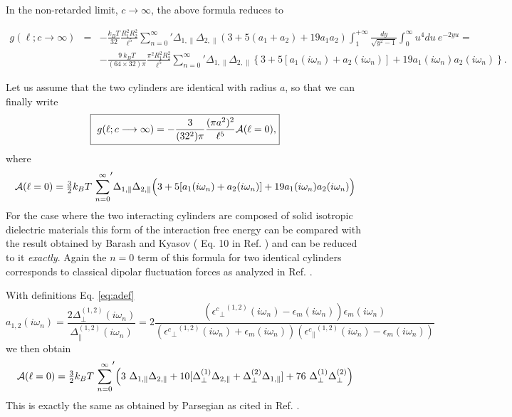\documentclass[onecolumn,letterpaper,amsmath,amssymb,floatfix,aps,superscriptaddress]{revtex4}
\begin{document}
In the non-retarded limit, $c \longrightarrow \infty$, the above formula  reduces to 
\begin{widetext}
\begin{eqnarray}
g(\ell; c \longrightarrow \infty) &=& - \frac{k_BT}{32} \frac{ R_1^{2} R_2^{2} }{\ell^5} {\sum_{n=0}^{\infty}}' \Delta_{1,\parallel} \Delta_{2,\parallel} 
\left( 3 + 5 (a_1+a_2) + 19 a_1 a_2 \right) \int_{1}^{+\infty}\!\!\!\!\! \frac{dy}{\sqrt{y^2 - 1}} \int_0^{\infty}\!\!\! u^4 du ~{e^{-2 y u }} = \nonumber\\
& & - \frac{9 ~k_BT}{(64 \times 32) \pi } \frac{\pi^2 R_1^{2} R_2^{2}}{\ell^5} {\sum_{n=0}^{\infty}}' \Delta_{1,\parallel} \Delta_{2,\parallel}
\left \{ 3 + 5 [ a_1(i \omega_n) + a_2(i \omega_n) ] + 19 a_1(i \omega_n) a_2(i \omega_n) \right \}.
\label{eq:cyl-paral-nonretarded}
\end{eqnarray}
\end{widetext}
Let us assume that the two cylinders are identical with radius $a$, so that we can finally write
\begin{equation}
  \fbox{
    $\displaystyle{
g(\ell; c \longrightarrow \infty) = - \frac{3}{(32^2) \pi } \frac{(\pi a^2)^{2}}{\ell^5} {\cal A}(\ell = 0),
\label{eq:cyl-paral-nonretarded-frq3}}$}
\end{equation}
where
\begin{equation}
{\cal A}(\ell = 0) = {\textstyle\frac32} {k_BT} ~ {\sum_{n=0}^{\infty}}' \Delta_{1,\parallel} \Delta_{2,\parallel}
\Big( 3 + 5 [ a_1(i \omega_n) + a_2(i \omega_n) ] + 19 a_1(i \omega_n) a_2(i \omega_n) \Big)
\end{equation}
For the case where the two interacting cylinders are composed of solid isotropic dielectric materials this form of the interaction free energy can be compared with the result obtained by Barash and Kyasov ( Eq. 10 in Ref. ) and can be reduced to it {\sl exactly}. Again the $n = 0$ term of this formula for two identical cylinders corresponds to classical dipolar fluctuation forces as analyzed in Ref. .

With definitions Eq. \ref{eq:adef}
\begin{equation}
a_{1,2}(i \omega_n) = \frac{2 \Delta_{\perp}^{(1,2)}(i \omega_n)}{\Delta_{\parallel}^{(1,2)}(i \omega_n)} = 2 \frac{({{\epsilon^{c}}_{\perp}}^{(1,2)}(i \omega_n) -\epsilon_{m}(i \omega_n)) \epsilon_{m}(i \omega_n)}{({{\epsilon^{c}}_{\perp}}^{(1,2)}(i \omega_n)+\epsilon_{m}(i \omega_n)) ({{\epsilon^{c}}_{\parallel}}^{(1,2)}(i \omega_n) -\epsilon_{m}(i \omega_n))}
\end{equation}
we then obtain
\begin{equation}
{\cal A}(\ell = 0) = {\textstyle\frac32} {k_BT} ~ {\sum_{n=0}^{\infty}}' \Big( 3~ \Delta_{1,\parallel} \Delta_{2,\parallel}
 + 10 [ \Delta_{\perp}^{(1)}\Delta_{2,\parallel} + \Delta_{\perp}^{(2)}\Delta_{1,\parallel} ] + 76~ \Delta_{\perp}^{(1)} \Delta_{\perp}^{(2)}\Big)
\end{equation}
This is exactly the same as obtained by Parsegian as cited in Ref. \cite{Parscyl}.
\end{document}
